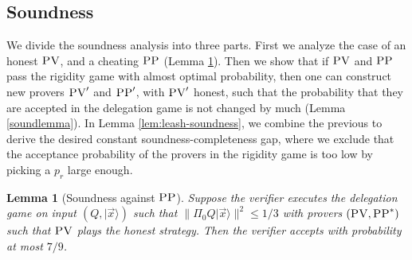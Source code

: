 \documentclass[11pt]{article}
\newtheorem{lemma}[theorem]{Lemma}
\theoremstyle{remark}
\theoremstyle{definition}
\newcommand{\ket}[1]{|#1\rangle}
\newcommand{\pv}{\textsc{PV}}
\newcommand{\pp}{\textsc{PP}}
\begin{document}
\subsection{Soundness}



We divide the soundness analysis into three parts. First we analyze the case of an honest $\pv$, and a cheating $\pp$ (Lemma \ref{lem:soundness-leash-pp}). Then we show that if $\pv$ and $\pp$ pass the rigidity game with almost optimal probability, then one can construct new provers $\pv'$ and $\pp'$, with $\pv'$ honest, such that the probability that they are accepted in the delegation game is not changed by much (Lemma \ref{soundlemma}). In Lemma \ref{lem:leash-soundness}, we combine the previous to derive the desired constant soundness-completeness gap, where we exclude that the acceptance probability of the provers in the rigidity game is too low by picking a $p_r$ large enough.


\begin{lemma}[Soundness against $\pp$]\label{lem:soundness-leash-pp}
Suppose the verifier executes the delegation  game on input $(Q,\ket{\vec{x}})$ such that $\|\Pi_0 Q\ket{\vec{x}}\|^2 \leq 1/3$ with provers $(\pv,\pp^*)$ such that $\pv$ plays the honest strategy. Then the verifier accepts with probability at most $7/9$. 
\end{lemma}
\end{document}
